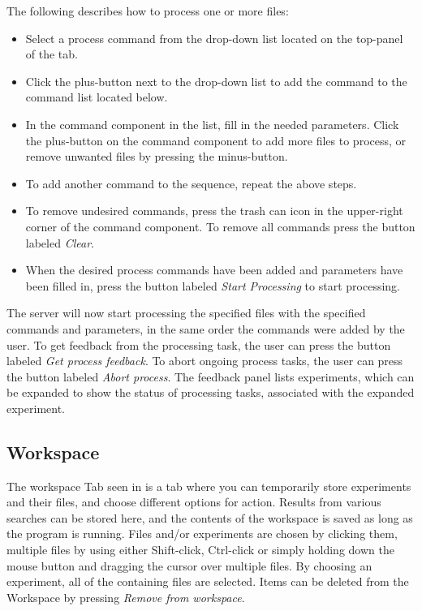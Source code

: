 The following describes how to process one or more files:
\begin{itemize}
	\item Select a process command from the drop-down list located on the top-panel of the tab.
	\item Click the plus-button next to the drop-down list to add the command to the command list located below.
	\item In the command component in the list, fill in the needed parameters. Click the plus-button on the command component to add more files to process, or remove unwanted files by pressing the minus-button.
	\item To add another command to the sequence, repeat the above steps.
	\item To remove undesired commands, press the trash can icon in the upper-right corner of the command component. To remove all commands press the button labeled \textit{Clear}.
	\item When the desired process commands have been added and parameters have been filled in, press the button labeled \textit{Start Processing} to start processing.
\end{itemize}	
	The server will now start processing the specified files with the specified commands and parameters, in the same order the commands were added by the user. To get feedback from the processing task, the user can press the button labeled \textit{Get process feedback}. To abort ongoing process tasks, the user can press the button labeled \textit{Abort process}. The feedback panel lists experiments, which can be expanded to show the status of processing tasks, associated with the expanded experiment.

\FloatBarrier

\subsection{Workspace} \label{sec:des_workspace}
The workspace Tab seen in  is a tab where you can temporarily store experiments and their files, and choose different options for action. Results from various searches can be stored here, and the contents of the workspace is saved as long as the program is running. Files and/or experiments are chosen by clicking them, multiple files by using either Shift-click, Ctrl-click or simply holding down the mouse button and dragging the cursor over multiple files. By choosing an experiment, all of the containing files are selected. Items can be deleted from the Workspace by pressing \emph{Remove from workspace}.
